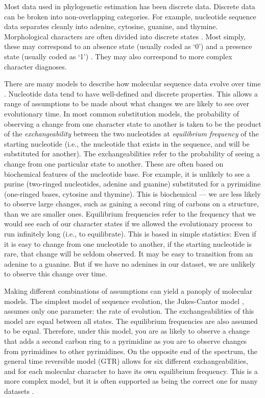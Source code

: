 \documentclass[11pt]{article}
\begin{document}
Most data used in phylogenetic estimation has been discrete data.
Discrete data can be broken into non-overlapping categories.
For example, nucleotide sequence data separates cleanly into adenine, cytosine, guanine, and thymine.
Morphological characters are often divided into discrete states \cite{de1985ontogenetic}.
Most simply, these may correspond to an absence state (usually coded as `0') and a presence state (usually coded as `1') \cite{watrous1981}.
They may also correspond to more complex character diagnoses.

There are many models to describe how molecular sequence data evolve over time \cite{Jukes1969, Kimura1980, Felsenstein1981, Hasegawa1985, Tavare1986}.
Nucleotide data tend to have well-defined and discrete properties.
This allows a range of assumptions to be made about what changes we are likely to see over evolutionary time.
In most common substitution models, the probability of observing a change from one character state to another is taken to be the product of the \textit{exchangeability} between the two nucleotides at \textit{equilibrium frequency} of the starting nucleotide (i.e., the nucleotide that exists in the sequence, and will be substituted for another). 
The exchangeabilities refer to the probability of seeing a change from one particular state to another.
These are often based on biochemical features of the nucleotide base.
For example, it is unlikely to see a purine (two-ringed nucleotides, adenine and guanine) substituted for a pyrimidine (one-ringed bases, cytosine and thymine). 
This is biochemical --- we are less likely to observe large changes, such as gaining a second ring of carbons on a structure, than we are smaller ones.
Equilibrium frequencies refer to the frequency that we would see each of our character states if we allowed the evolutionary process to run infinitely long (i.e., to equilibrate).
This is based in simple statistics: Even if it is easy to change from one nucleotide to another, if the starting nucleotide is rare, that change will be seldom observed.
It may be easy to transition from an adenine to a guanine.
But if we have no adenines in our dataset, we are unlikely to observe this change over time.
\clearpage












Making different combinations of assumptions can yield a panoply of molecular models.
The simplest model of sequence evolution, the Jukes-Cantor model \cite{Jukes1969}, assumes only one parameter: the rate of evolution.
The exchangeabilities of this model are equal between all states. 
The equilibrium frequencies are also assumed to be equal.
Therefore, under this model, you are as likely to observe a change that adds a second carbon ring to a pyrimidine as you are to observe changes from pyrimidines to other pyrimidines.
On the opposite end of the spectrum, the general time reversible model (GTR) \cite{Tavare1986} allows for six different exchangeabilities, and for each molecular character to have its own equilibrium frequency.
This is a more complex model, but it is often supported as being the correct one for many datasets \cite{abadi2019}.
\end{document}
